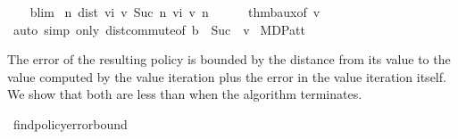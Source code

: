 \begin{isabellebody}
%
\isadelimproof
\ \ %
\endisadelimproof
%
\isatagproof
{}\isamarkupfalse%
\ {\isasymL}\isactrlsub b{\isacharunderscore}{\kern0pt}lim\isacommand{{\isachardot}{\kern0pt}}\isamarkupfalse%
%
\endisatagproof
{\isafoldproof}%
%
\isadelimproof
\isanewline
%
\endisadelimproof
\isanewline
{}\isamarkupfalse%
\ {\isachardoublequoteopen}{\isacharparenleft}{\kern0pt}{\isasymlambda}n{\isachardot}{\kern0pt}\ dist\ {\isacharparenleft}{\kern0pt}vi\ v\ {\isacharparenleft}{\kern0pt}Suc\ n{\isacharparenright}{\kern0pt}{\isacharparenright}{\kern0pt}\ {\isacharparenleft}{\kern0pt}vi\ v\ n{\isacharparenright}{\kern0pt}{\isacharparenright}{\kern0pt}\ {\isasymlonglonglongrightarrow}\ {}{\isachardoublequoteclose}\isanewline
%
\isadelimproof
\ \ %
\endisadelimproof
%
\isatagproof
{}\isamarkupfalse%
\ thm{\isacharunderscore}{\kern0pt}{}{\isacharunderscore}{\kern0pt}{}{\isacharunderscore}{\kern0pt}{}{\isacharunderscore}{\kern0pt}b{\isacharunderscore}{\kern0pt}aux{\isacharbrackleft}{\kern0pt}of\ v{\isacharbrackright}{\kern0pt}\isanewline
\ \ \isamarkupfalse%
\ {\isacharparenleft}{\kern0pt}auto\ simp\ only{\isacharcolon}{\kern0pt}\ dist{\isacharunderscore}{\kern0pt}commute{\isacharbrackleft}{\kern0pt}of\ {\isachardoublequoteopen}{\isacharparenleft}{\kern0pt}{\isacharparenleft}{\kern0pt}{\isasymL}\isactrlsub b\ {\isacharcircum}{\kern0pt}{\isacharcircum}{\kern0pt}\ Suc\ {\isacharunderscore}{\kern0pt}{\isacharparenright}{\kern0pt}\ v{\isacharparenright}{\kern0pt}{\isachardoublequoteclose}{\isacharbrackright}{\kern0pt}{\isacharparenright}{\kern0pt}%
\endisatagproof
{\isafoldproof}%
%
\isadelimproof
\isanewline
%
\endisadelimproof
\isanewline
\isanewline
\isanewline
{}\isamarkupfalse%
\isanewline
\isanewline
{}\isamarkupfalse%
\ MDP{\isacharunderscore}{\kern0pt}att{\isacharunderscore}{\kern0pt}{\isasymL}\ \isanewline
{}%
\begin{isamarkuptext}%
The error of the resulting policy is bounded by the distance from its value to the value computed 
by the value iteration plus the error in the value iteration itself.
We show that both are less than  when the algorithm terminates.%
\end{isamarkuptext}\isamarkuptrue%
\isamarkupfalse%
\ find{\isacharunderscore}{\kern0pt}policy{\isacharunderscore}{\kern0pt}error{\isacharunderscore}{\kern0pt}bound{\isacharcolon}{\kern0pt}\isanewline

\end{isabellebody}
